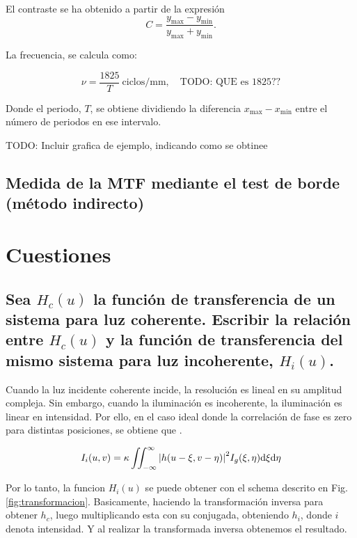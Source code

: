 \documentclass{./packages/optica-article}
\begin{document}
El contraste se ha obtenido a partir de la expresión
\nopagebreak
\begin{equation}
	C = \frac{y_{\max} - y_{\min}}{y_{\max} + y_{\min}}.
	\label{eq:contraste}
\end{equation}

La frecuencia, se calcula como:

\begin{equation}
	\nu = \frac{1825}{T}\ \textrm{ciclos/mm},\quad\textrm{TODO: QUE es 1825??}
	\label{eq:frecuencia}
\end{equation}

Donde el periodo, $T$, se obtiene dividiendo la diferencia $x_{\max} - x_{\min}$ entre el número de periodos en ese intervalo.

TODO: Incluir grafica de ejemplo, indicando como se obtinee

\subsection{Medida de la MTF mediante el test de borde (método indirecto)}

\section{Cuestiones}

\subsection{Sea $H_{c}(u)$ la función de transferencia de un sistema para luz coherente. Escribir la relación entre $H_{c}(u)$ y la función de transferencia del mismo sistema para luz incoherente, $H_{i}(u)$.}

Cuando la luz incidente coherente incide, la resolución es lineal en su amplitud compleja. Sin embargo, cuando la iluminación es incoherente, la iluminación es linear en intensidad. Por ello, en el caso ideal donde la correlación de fase es zero para distintas posiciones, se obtiene que \cite[p.~132--134]{goodman1996introduction}.

\begin{equation}
	I_{i}(u,v) = \kappa \iint_{-\infty}^{\infty}\abs{h(u - \xi, v- \eta)}^{2} I_{g}(\xi, \eta) \dd \xi \dd \eta
\end{equation}

Por lo tanto, la funcion $H_{i}(u)$ se puede obtener con el schema descrito en Fig. \ref{fig:transformacion}. Basicamente, haciendo la transformación inversa para obtener $h_{c}$, luego multiplicando esta con su conjugada, obteniendo $h_{i}$, donde $i$ denota intensidad. Y al realizar la transformada inversa obtenemos el resultado.
\end{document}
